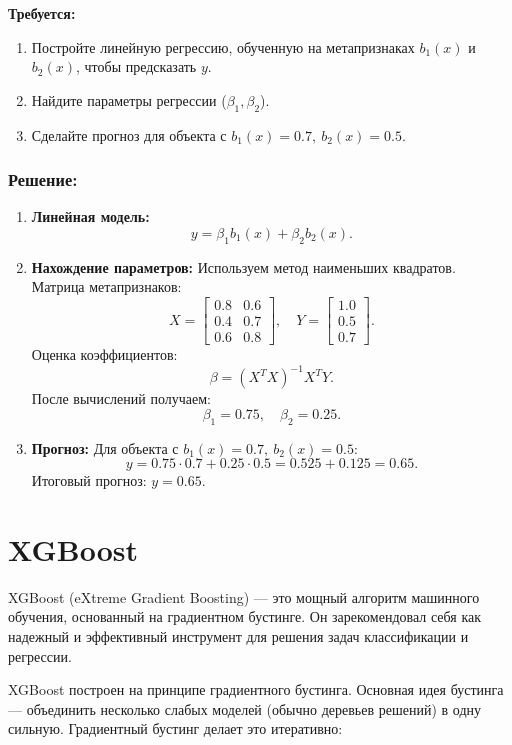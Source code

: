 \textbf{Требуется:}
\begin{enumerate}
    \item Постройте линейную регрессию, обученную на метапризнаках $b_1(x)$ и $b_2(x)$, чтобы предсказать $y$.
    \item Найдите параметры регрессии ($\beta_1, \beta_2$).
    \item Сделайте прогноз для объекта с $b_1(x) = 0.7, \ b_2(x) = 0.5$.
\end{enumerate}

\subsubsection*{Решение:}
\begin{enumerate}
    \item \textbf{Линейная модель:}
    \[
    y = \beta_1 b_1(x) + \beta_2 b_2(x).
    \]

    \item \textbf{Нахождение параметров:}
    Используем метод наименьших квадратов. Матрица метапризнаков:
    \[
    X = \begin{bmatrix}
    0.8 & 0.6 \\
    0.4 & 0.7 \\
    0.6 & 0.8
    \end{bmatrix}, \quad Y = \begin{bmatrix}
    1.0 \\
    0.5 \\
    0.7
    \end{bmatrix}.
    \]
    Оценка коэффициентов:
    \[
    \beta = (X^T X)^{-1} X^T Y.
    \]
    После вычислений получаем:
    \[
    \beta_1 = 0.75, \quad \beta_2 = 0.25.
    \]

    \item \textbf{Прогноз:}
    Для объекта с $b_1(x) = 0.7, \ b_2(x) = 0.5$:
    \[
    y = 0.75 \cdot 0.7 + 0.25 \cdot 0.5 = 0.525 + 0.125 = 0.65.
    \]
    Итоговый прогноз: $y = 0.65$.
\end{enumerate}

\section{XGBoost}
XGBoost (eXtreme Gradient Boosting) — это мощный алгоритм машинного обучения, основанный на градиентном бустинге. Он зарекомендовал себя как надежный и эффективный инструмент для решения задач классификации и регрессии.

XGBoost построен на принципе градиентного бустинга. Основная идея бустинга — объединить несколько слабых моделей (обычно деревьев решений) в одну сильную. Градиентный бустинг делает это итеративно:

